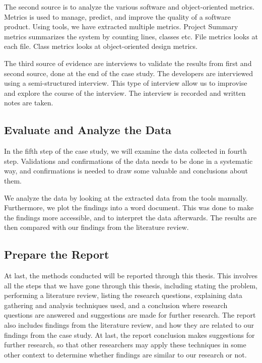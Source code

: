 The second source is to analyze the various software and object-oriented metrics. Metrics is used to manage, predict, and improve the quality of a software product\cite{rodriguez2001overview}. Using tools, we have extracted multiple metrics. Project Summary metrics summarizes the system by counting lines, classes etc. File metrics looks at each file. Class metrics looks at object-oriented design metrics. 


The third source of evidence are interviews to validate the results from first and second source, done at the end of the case study. The developers are interviewed using a semi-structured interview. This type of interview allow us to improvise and explore the course of the interview. The interview is recorded and written notes are taken.




\subsection{Evaluate and Analyze the Data}
In the fifth step of the case study, we will examine the data collected in fourth step. Validations and confirmations of the data needs to be done in a systematic way, and confirmations is needed to draw some valuable and conclusions about them.

We analyze the data by looking at the extracted data from the tools manually. Furthermore, we plot the findings into a word document. This was done to make the findings more accessible, and to interpret the data afterwards. The results are then compared with our findings from the literature review. 



\subsection{Prepare the Report}
At last, the methods conducted will be reported through this thesis. This involves all the steps that we have gone through this thesis, including stating the problem, performing a literature review, listing the research questions, explaining data gathering and analysis techniques used, and a conclusion where research questions are answered and suggestions are made for further research. The report also includes findings from the literature review, and how they are related to our findings from the case study. At last, the report conclusion makes suggestions for further research, so that other researchers may apply these techniques in some other context to determine whether findings are similar to our research or not.

